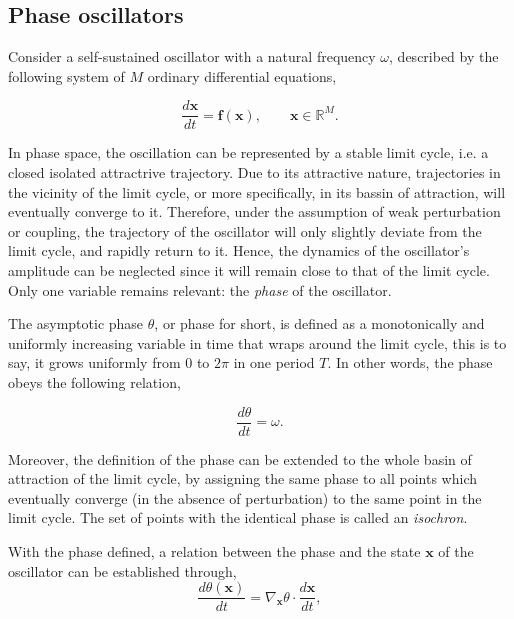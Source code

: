 \subsection{Phase oscillators}
\label{sec:phase_oscillators}

Consider a self-sustained oscillator with a natural frequency $\omega$, described by the following
system of $M$ ordinary differential equations,

\begin{equation}
    \dfrac{d \mathbf{x}}{dt} = \mathbf{f}(\mathbf{x}), \qquad \mathbf{x} \in \mathbb{R}^M.
    \label{eq:pre_phase_osc}
\end{equation}

In phase space, the oscillation can be represented by a stable limit cycle, i.e. 
a closed isolated attractrive trajectory. Due to its attractive nature, trajectories in the vicinity
of the limit cycle, or more specifically, in its bassin of attraction, will eventually converge to it.
Therefore, under the assumption of weak perturbation or coupling, the trajectory of the oscillator will
only slightly deviate from the limit cycle, and rapidly return to it. Hence, the dynamics
of the oscillator's amplitude can be neglected since it will remain close to that of the
limit cycle. Only one variable remains relevant: the {\em phase} of the oscillator.

The asymptotic phase $\theta$, or phase for short, is defined
as a monotonically and uniformly increasing variable in time that wraps around the limit cycle,
this is to say, it grows uniformly from $0$ to $2\pi$ in one period $T$. 
In other words, the phase obeys the following relation,

\begin{equation}
    \dfrac{d\theta}{dt} = \omega.
    \label{eq:pre_phase_osc_phase}
\end{equation}

Moreover, the definition of the phase can be extended
to the whole basin of attraction of the limit cycle, by assigning the same phase to all points
which eventually converge (in the absence of perturbation) to the same point in the limit cycle.
The set of points with the identical phase is called an {\em isochron}.

With the phase defined, a relation between the phase and the state $\mathbf{x}$ of the oscillator 
can be established through,
\begin{equation*}
    \dfrac{d\theta(\mathbf{x})}{dt} = \nabla_\mathbf{x} \theta \cdot \dfrac{d\mathbf{x}}{dt},
\end{equation*}

